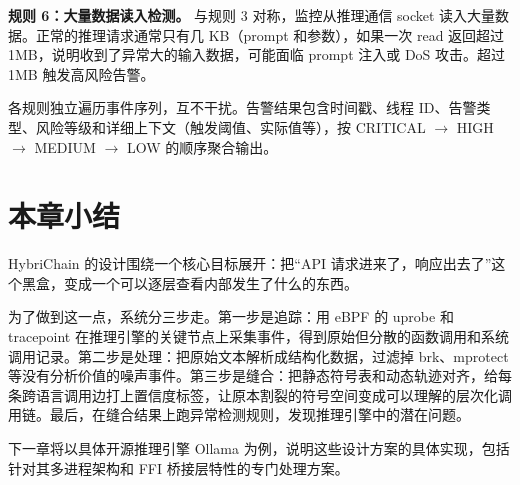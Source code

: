 \textbf{规则 6：大量数据读入检测。} 与规则 3 对称，监控从推理通信 socket 读入大量数据。正常的推理请求通常只有几 KB（prompt 和参数），如果一次 read 返回超过 1MB，说明收到了异常大的输入数据，可能面临 prompt 注入或 DoS 攻击。超过 1MB 触发高风险告警。

各规则独立遍历事件序列，互不干扰。告警结果包含时间戳、线程 ID、告警类型、风险等级和详细上下文（触发阈值、实际值等），按 CRITICAL $\to$ HIGH $\to$ MEDIUM $\to$ LOW 的顺序聚合输出。

\section{本章小结}

HybriChain 的设计围绕一个核心目标展开：把“API 请求进来了，响应出去了”这个黑盒，变成一个可以逐层查看内部发生了什么的东西。

为了做到这一点，系统分三步走。第一步是追踪：用 eBPF 的 uprobe 和 tracepoint 在推理引擎的关键节点上采集事件，得到原始但分散的函数调用和系统调用记录。第二步是处理：把原始文本解析成结构化数据，过滤掉 brk、mprotect 等没有分析价值的噪声事件。第三步是缝合：把静态符号表和动态轨迹对齐，给每条跨语言调用边打上置信度标签，让原本割裂的符号空间变成可以理解的层次化调用链。最后，在缝合结果上跑异常检测规则，发现推理引擎中的潜在问题。

下一章将以具体开源推理引擎 Ollama 为例，说明这些设计方案的具体实现，包括针对其多进程架构和 FFI 桥接层特性的专门处理方案。
